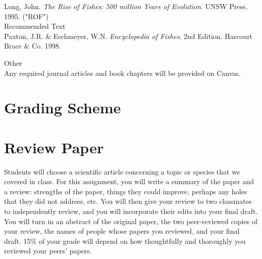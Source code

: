 \documentclass[letterpaper]{inzane_syllabus} %
\begin{document}
\vspace{-7pt}
Long, John. \textit{The Rise of Fishes: 500 million Years of Evolution}. UNSW Press. 1995. ("ROF") \\

{\color{myGreen} Recommended Text}\\
Paxton, J.R. \& Eschmeyer, W.N. \textit{Encyclopedia of Fishes}. 2nd Edition. Harcourt Brace \& Co. 1998. 

{\color{myGreen} Other}\\
Any required journal articles and book chapters will be provided on Canvas. 

\vspace{0.5cm}
\section{Grading Scheme}


\begin{twentyshort} %
\end{twentyshort}

\vspace{0.5cm}
\section{Review Paper}

Students will choose a scientific article concerning a topic or species that we covered in class. For this assignment, you will write a summary of the paper and a review: strengths of the paper, things they could improve, perhaps any holes that they did not address, etc. You will then give your review to two classmates to independently review, and you will incorporate their edits into your final draft. You will turn in an abstract of the original paper, the two peer-reviewed copies of your review, the names of people whose papers you reviewed, and your final draft. 15\% of your grade will depend on how thoughtfully and thoroughly you reviewed your peers' papers.   
\end{document}
